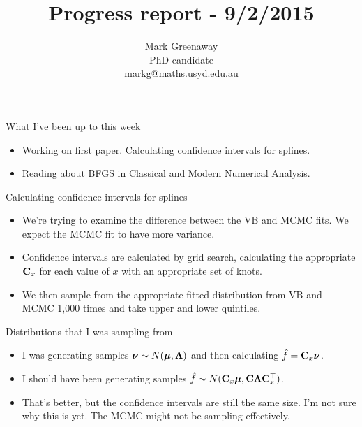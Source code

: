 \documentclass{beamer}
\title{Progress report - 9/2/2015}
\author{Mark Greenaway\\PhD candidate\\markg@maths.usyd.edu.au}
\begin{document}
\begin{frame}
\maketitle
\end{frame}

\begin{frame}{What I've been up to this week}
\begin{itemize}
\item Working on first paper. Calculating confidence intervals for splines.
\item Reading about BFGS in Classical and Modern Numerical Analysis.
\end{itemize}
\end{frame}

\begin{frame}{Calculating confidence intervals for splines}
\begin{itemize}
\item We're trying to examine the difference between the VB and MCMC fits.
We expect the MCMC fit to have more variance.
\item Confidence intervals are calculated by grid search, calculating the
appropriate ${\bf C}_x$ for each value of $x$ with an appropriate set of knots.
\item We then sample from the appropriate fitted distribution from VB and MCMC 
1,000 times and take upper and lower quintiles.
\end{itemize}
\end{frame}

\begin{frame}{Distributions that I was sampling from}
\begin{itemize}
\item I was generating samples ${\boldsymbol \nu} \sim N({\boldsymbol \mu}, {\boldsymbol \Lambda})$ and then 
calculating $\hat{f} = {\bf C}_x {\boldsymbol \nu}$.
\item I should have been generating samples $\hat{f} \sim N({\bf C}_x {\boldsymbol \mu}, {\bf C} {\boldsymbol \Lambda} {\bf C}_x^\top)$.
\item That's better, but the confidence intervals are still the same size.
I'm not sure why this is yet. The MCMC might not be sampling effectively.
\end{itemize}
\end{frame}
\end{document}
